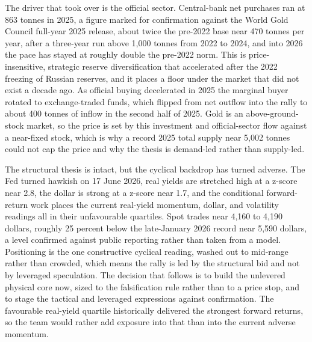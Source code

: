 \documentclass[11pt,a4paper]{article}
\begin{document}
The driver that took over is the official sector. Central-bank net purchases ran at 863 tonnes in 2025, a figure marked for confirmation against the World Gold Council full-year 2025 release, about twice the pre-2022 base near 470 tonnes per year, after a three-year run above 1,000 tonnes from 2022 to 2024, and into 2026 the pace has stayed at roughly double the pre-2022 norm. This is price-insensitive, strategic reserve diversification that accelerated after the 2022 freezing of Russian reserves, and it places a floor under the market that did not exist a decade ago. As official buying decelerated in 2025 the marginal buyer rotated to exchange-traded funds, which flipped from net outflow into the rally to about 400 tonnes of inflow in the second half of 2025. Gold is an above-ground-stock market, so the price is set by this investment and official-sector flow against a near-fixed stock, which is why a record 2025 total supply near 5,002 tonnes could not cap the price and why the thesis is demand-led rather than supply-led.

The structural thesis is intact, but the cyclical backdrop has turned adverse. The Fed turned hawkish on 17 June 2026, real yields are stretched high at a z-score near 2.8, the dollar is strong at a z-score near 1.7, and the conditional forward-return work places the current real-yield momentum, dollar, and volatility readings all in their unfavourable quartiles. Spot trades near 4,160 to 4,190 dollars, roughly 25 percent below the late-January 2026 record near 5,590 dollars, a level confirmed against public reporting rather than taken from a model. Positioning is the one constructive cyclical reading, washed out to mid-range rather than crowded, which means the rally is led by the structural bid and not by leveraged speculation. The decision that follows is to build the unlevered physical core now, sized to the falsification rule rather than to a price stop, and to stage the tactical and leveraged expressions against confirmation. The favourable real-yield quartile historically delivered the strongest forward returns, so the team would rather add exposure into that than into the current adverse momentum.
\end{document}
